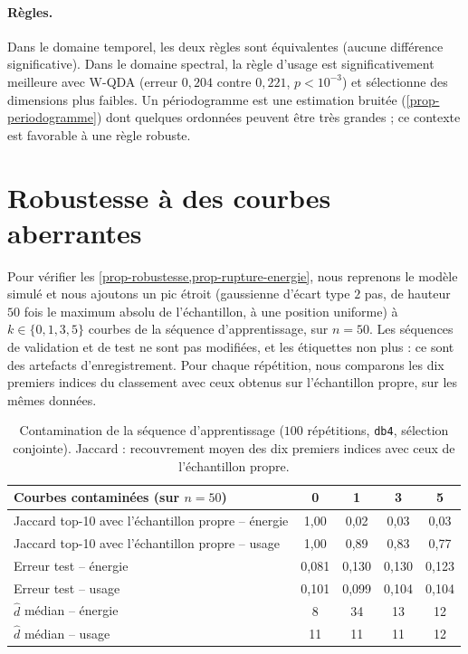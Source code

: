 \paragraph{Règles.} Dans le domaine temporel, les deux règles sont équivalentes (aucune différence significative). Dans le domaine spectral, la règle d'usage est significativement meilleure avec W-QDA (erreur $0{,}204$ contre $0{,}221$, $p<10^{-3}$) et sélectionne des dimensions plus faibles. Un périodogramme est une estimation bruitée (\cref{prop-periodogramme}) dont quelques ordonnées peuvent être très grandes ; ce contexte est favorable à une règle robuste.

\section{Robustesse à des courbes aberrantes}\label{sec-exp-contamination}

Pour vérifier les \cref{prop-robustesse,prop-rupture-energie}, nous reprenons le modèle simulé et nous ajoutons un pic étroit (gaussienne d'écart type $2$ pas, de hauteur $50$ fois le maximum absolu de l'échantillon, à une position uniforme) à $k\in\{0,1,3,5\}$ courbes de la séquence d'apprentissage, sur $n=50$. Les séquences de validation et de test ne sont pas modifiées, et les étiquettes non plus : ce sont des artefacts d'enregistrement. Pour chaque répétition, nous comparons les dix premiers indices du classement avec ceux obtenus sur l'échantillon propre, sur les mêmes données.

\begin{table}[ht]
\centering
\small
\begin{tabular}{@{}lcccc@{}}
\toprule
Courbes contaminées (sur $n=50$) & 0 & 1 & 3 & 5 \\
\midrule
Jaccard top-10 avec l'échantillon propre -- énergie & 1{,}00 & 0{,}02 & 0{,}03 & 0{,}03 \\
Jaccard top-10 avec l'échantillon propre -- usage & 1{,}00 & 0{,}89 & 0{,}83 & 0{,}77 \\
\addlinespace
Erreur test -- énergie & 0{,}081 & 0{,}130 & 0{,}130 & 0{,}123 \\
Erreur test -- usage & 0{,}101 & 0{,}099 & 0{,}104 & 0{,}104 \\
\addlinespace
$\hat d$ médian -- énergie & 8 & 34 & 13 & 12 \\
$\hat d$ médian -- usage & 11 & 11 & 11 & 12 \\
\bottomrule
\end{tabular}

\caption{Contamination de la séquence d'apprentissage ($100$ répétitions, \texttt{db4}, sélection conjointe). Jaccard : recouvrement moyen des dix premiers indices avec ceux de l'échantillon propre.}
\label{tab-contamination}
\end{table}

